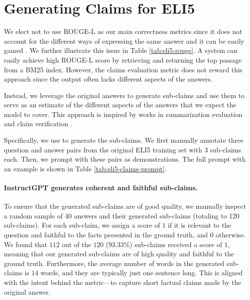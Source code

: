 
\section{Generating Claims for ELI5}
\label{app_sec:claim_eli5}



We elect not to use ROUGE-L as our main correctness metrics since it does not account for the different ways of expressing the same answer and it can be easily gamed \cite{krishna-etal-2021-hurdles}.
We further illustrate this issue in Table \ref{tab:eli5-rouge}.
A system can easily achieve high ROUGE-L score by retrieving and returning the top passage from a BM25 index.
However, the claims evaluation metric does not reward this approach since the output often lacks different aspects of the answers.


Instead, we leverage the original answers 
to generate sub-claims
and use them to serve as an estimate of the different aspects of the answers that we expect the model to cover.
This approach is inspired by works in summarization evaluation and claim verification \cite{zhang-bansal-2021-finding,kamoi2023wice,wang-etal-2020-asking}.


Specifically, we use   to generate the sub-claims.
We first manually annotate three question and answer pairs from the original ELI5 training set with 3 sub-claims each.
Then, we prompt  with these pairs as demonstrations.
The full prompt with an example is shown in Table \ref{tab:eli5-claims-prompt}.

\paragraph{InstructGPT generates coherent and faithful sub-claims.}
To ensure that the generated sub-claims are of good quality, we manually inspect a random sample of 40 answers and their generated sub-claims (totaling to 120 sub-claims).
For each sub-claim, we assign a score of $1$ if it is relevant to the question and faithful to the facts presented in the ground truth, and $0$ otherwise.
We found that $112$ out of the $120$ ($93.33\%$) sub-claims received a score of $1$, meaning that our generated sub-claims are of high quality and faithful to the ground truth.
Furthermore, the average number of words in the generated sub-claims is $14$ words, and they are typically just one sentence long.
This is aligned with  the intent behind the metric---to capture short factual claims made by the original answer.

